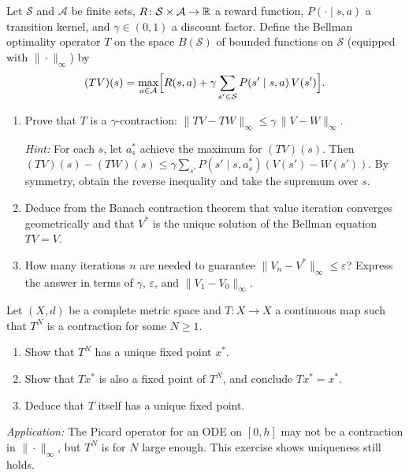 \documentclass[11pt,a4paper]{article}
\begin{document}
\begin{exercise}\label{ex:bellman}
Let $\mathcal{S}$ and $\mathcal{A}$ be finite sets,
$R \colon \mathcal{S} \times \mathcal{A} \to \mathbb{R}$ a reward function,
$P(\cdot \mid s, a)$ a transition kernel, and $\gamma \in (0, 1)$ a
discount factor.  Define the Bellman optimality operator $T$ on the
space $B(\mathcal{S})$ of bounded functions on $\mathcal{S}$ (equipped
with $\|\cdot\|_\infty$) by
\[
    (TV)(s)
    = \max_{a \in \mathcal{A}}
    \Bigl[ R(s,a) + \gamma \sum_{s' \in \mathcal{S}}
    P(s' \mid s, a)\, V(s') \Bigr].
\]
\begin{enumerate}[label=(\alph*)]
    \item Prove that $T$ is a $\gamma$-contraction:
          $\|TV - TW\|_\infty \leq \gamma\, \|V - W\|_\infty$.

          \emph{Hint:}  For each $s$, let $a_s^*$ achieve the maximum
          for $(TV)(s)$.  Then
          $(TV)(s) - (TW)(s) \leq \gamma \sum_{s'} P(s' \mid s, a_s^*)
          (V(s') - W(s'))$.  By symmetry, obtain the reverse
          inequality and take the supremum over $s$.
    \item Deduce from the Banach contraction theorem that value
          iteration converges geometrically and that $V^*$ is the
          unique solution of the Bellman equation $TV = V$.
    \item How many iterations $n$ are needed to guarantee
          $\|V_n - V^*\|_\infty \leq \varepsilon$?  Express the
          answer in terms of $\gamma$, $\varepsilon$, and
          $\|V_1 - V_0\|_\infty$.
\end{enumerate}
\end{exercise}

\begin{exercise}\label{ex:contractive-iterate}
Let $(X, d)$ be a complete metric space and $T \colon X \to X$ a
continuous map such that $T^N$ is a contraction for some $N \geq 1$.
\begin{enumerate}[label=(\alph*)]
    \item Show that $T^N$ has a unique fixed point $x^*$.
    \item Show that $Tx^*$ is also a fixed point of $T^N$, and
          conclude $Tx^* = x^*$.
    \item Deduce that $T$ itself has a unique fixed point.
\end{enumerate}
\emph{Application:}  The Picard operator for an ODE on $[0, h]$ may
not be a contraction in $\|\cdot\|_\infty$, but $T^N$ is for $N$
large enough.  This exercise shows uniqueness still holds.
\end{exercise}
\end{document}
